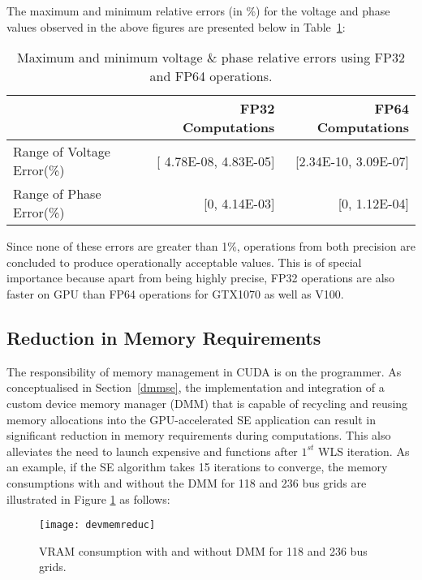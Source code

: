 \documentclass[thesis.tex]{subfiles}
\begin{document}
The maximum and minimum relative errors (in \%) for the voltage and phase values observed in the above figures are presented below in Table~\ref{relativeerrors}:
{\renewcommand{\arraystretch}{1.3}%
\begin{table}[H]
	\centering
	\begin{tabular}{|l|r|r|}
		\hline 
		& FP32 Computations & FP64 Computations \\ 
		\hline 
		Range of Voltage Error(\%) & [ 4.78E-08, 4.83E-05] & [2.34E-10, 3.09E-07] \\ 
		\hline 
		Range of Phase Error(\%) & [0, 4.14E-03] & [0, 1.12E-04] \\ 
		\hline 
	\end{tabular} 
	\caption{Maximum and minimum voltage \& phase relative errors using FP32 and FP64 operations.}
	\label{relativeerrors}
\end{table}}

Since none of these errors are greater than 1\%, operations from both precision are concluded to produce operationally acceptable values. This is of special importance because apart from being highly precise, FP32 operations are also faster on GPU than FP64 operations for GTX1070 as well as V100. 

\subsection{Reduction in Memory Requirements}
The responsibility of memory management in CUDA is on the programmer. As conceptualised in Section~\ref{dmmse}, the implementation and integration of a custom device memory manager (DMM) that is capable of recycling and reusing memory allocations into the GPU-accelerated SE application can result in significant reduction in memory requirements during computations. This also alleviates the need to launch expensive  and  functions after $1^{st}$ WLS iteration. As an example, if the SE algorithm takes 15 iterations to converge, the memory consumptions with and without the DMM for 118 and 236 bus grids are illustrated in Figure \ref{fig:devmemreduc} as follows:

\begin{figure}[H]
	\centering
	\texttt{[image: devmemreduc]}
	\caption{VRAM consumption with and without DMM for 118 and 236 bus grids.}
	\label{fig:devmemreduc}
\end{figure}
\end{document}
